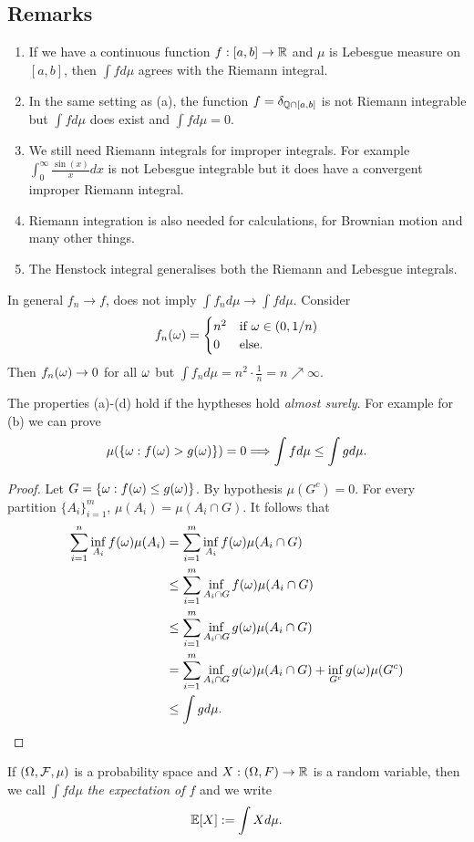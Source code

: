 \subsection{Remarks}
\begin{enumerate}
    \item  If we have a  continuous function $f : [a,b] \to {\mathbb R}$ and $\mu$ is Lebesgue measure on $[a,b]$, then $\int f d\mu$ agrees with the Riemann integral.
    \item In the same setting as (a), the function $f = \delta_{{\mathbb{Q}} \cap [a,b]}$ is not Riemann integrable but $\int fd\mu$ does exist and $\int f d\mu = 0$.
    \item We still need Riemann integrals for improper integrals. For example $\int_0^\infty \frac{\sin(x)}{x}dx$ is not Lebesgue integrable but it does have a convergent improper Riemann integral. 
    \item Riemann integration is also needed for calculations, for Brownian motion and many other things.
    \item The Henstock integral generalises both the Riemann and Lebesgue integrals.
\end{enumerate}
\begin{ex}
    In general $f_n \to f$, does not imply $\int f_n d \mu \to \int f d \mu$. Consider
    \[f_n({\omega}) = \begin{cases}
        n^2 & \text{if } {\omega} \in (0, 1/n)\\
        0 & \text{else.}
    \end{cases} \]
    Then $f_n({\omega}) \to 0$ for all ${\omega}$ but $\int f_n d\mu = n^2 \cdot \frac{1}{n} = n \nearrow \infty$.
\end{ex}
The properties (a)-(d) hold if the hyptheses hold \emph{almost surely}. For example for (b) we can prove
\[\mu(\{{\omega} : f({\omega}) > g({\omega})\}) =0 \Longrightarrow \int f d\mu \le \int g d\mu. \]
\begin{proof}
    Let $G = \{{\omega} : f({\omega}) \le g({\omega})\}$. By hypothesis $\mu(G^c) = 0$. For every partition $\{A_i\}_{i=1}^m$, $\mu(A_i) = \mu(A_i \cap G)$. It follows that
    \begin{align*}
        \sum_{i=1}^n \inf_{A_i} f({\omega}) \mu(A_i) &= \sum_{i=1}^m \inf_{A_i} f({\omega}) \mu(A_i\cap G)\\
        &\le \sum_{i=1}^m \inf_{A_i\cap G} f({\omega}) \mu(A_i\cap G)\\
        &\le \sum_{i=1}^m \inf_{A_i \cap G} g({\omega}) \mu(A_i\cap G)\\
        &=\sum_{i=1}^m \inf_{A_i \cap G} g({\omega}) \mu(A_i\cap G) + \inf_{G^c}g({\omega}) \mu(G^c)\\
        &\le \int g d\mu. \qedhere
    \end{align*}
\end{proof}
\begin{defn}
    If $({{\Omega}}, {\mathcal{F}}, \mu)$ is a probability space and $X:({{\Omega}},F) \to {\mathbb R}$ is a random variable, then we call $\int f d\mu$ \emph{the expectation of $f$} and we write
    \[{\mathbb{E}}[X] := \int X d\mu. \]
\end{defn}
